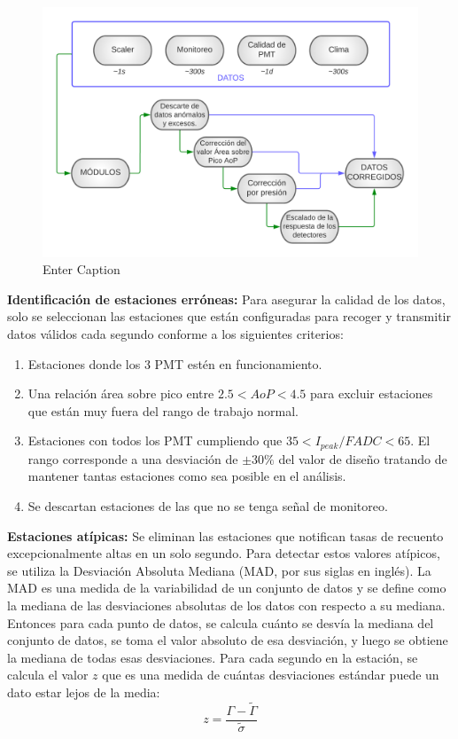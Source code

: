 \begin{figure}
\centering
    \includegraphics[width=0.7\linewidth]{Figs/SCALER.png}
    \caption{Enter Caption}
    \label{esquema_datos}
\end{figure}
\textbf{Identificación de estaciones erróneas:} Para asegurar la calidad de los datos, solo se seleccionan las estaciones que están configuradas para recoger y transmitir datos válidos cada segundo conforme a los siguientes criterios:
\begin{enumerate}
    \item Estaciones donde los 3 PMT estén en funcionamiento.
    \item Una relación área sobre pico entre $2.5 < AoP < 4.5$ para excluir estaciones que están muy fuera del rango de trabajo normal.
    \item   Estaciones con todos los PMT cumpliendo que $35 < I_{peak}/FADC < 65$. El rango corresponde a una desviación de $\pm30\%$ del valor de diseño tratando de mantener tantas estaciones como sea posible en el análisis.
    \item Se descartan estaciones de las que no se tenga señal de monitoreo.
\end{enumerate}

\textbf{Estaciones atípicas:} Se eliminan las estaciones que notifican tasas de recuento excepcionalmente altas en un solo segundo. Para detectar estos valores atípicos, se utiliza la Desviación Absoluta Mediana (MAD, por sus siglas en inglés). La MAD es una medida de la variabilidad de un conjunto de datos y se define como la mediana de las desviaciones absolutas de los datos con respecto a su mediana. Entonces para cada punto de datos, se calcula cuánto se desvía la mediana del conjunto de datos, se toma el valor absoluto de esa desviación, y luego se obtiene la mediana de todas esas desviaciones. Para cada segundo en la estación, se calcula el valor $z$ que es una medida de cuántas desviaciones estándar puede un dato estar lejos de la media:
\begin{equation}
    z=\frac{\Gamma-\tilde{\Gamma}}{\tilde{\sigma}}
\end{equation}

